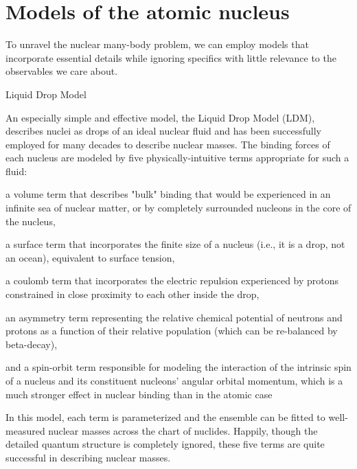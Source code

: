 
\section{Models of the atomic nucleus}

To unravel the nuclear many-body problem, we can
employ models that incorporate essential details while ignoring specifics with
little relevance to the observables we care about.

Liquid Drop Model

An especially simple and
effective model, the Liquid Drop Model (LDM), describes nuclei as drops of
an ideal nuclear fluid and has been successfully employed for many decades to
describe nuclear masses. The binding forces of each nucleus are modeled by five
physically-intuitive terms appropriate for such a fluid:

a volume term that describes "bulk" binding that would be experienced in an
infinite sea of nuclear matter, or  by completely surrounded nucleons in the core of the nucleus,

a surface term that incorporates the finite size of a nucleus (i.e., it is a
drop, not an ocean), equivalent to surface tension,

a coulomb term that incorporates the electric repulsion experienced by protons
constrained in close proximity to each other inside the drop,

an asymmetry term representing the relative chemical potential of neutrons and
protons as a function of their relative population (which can be re-balanced by
beta-decay),

and a spin-orbit term responsible for modeling the interaction of the intrinsic spin
of a nucleus and its constituent nucleons' angular orbital momentum, which is
a much stronger effect in nuclear binding than in the atomic case

In this model, each term is parameterized and the ensemble can be fitted to
well-measured nuclear masses across the chart of nuclides. Happily, though the detailed
quantum structure is completely ignored, these five terms are quite successful
in describing nuclear masses.

